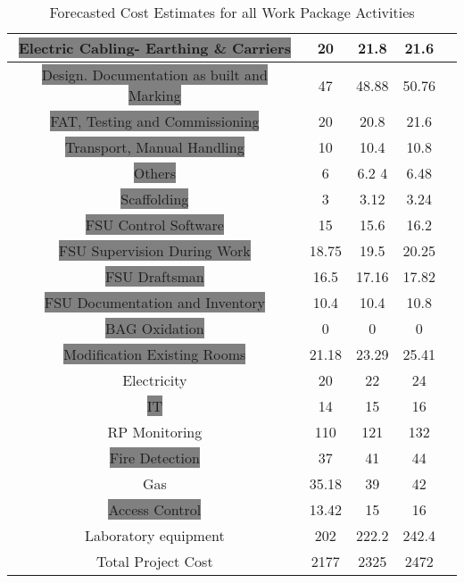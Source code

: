 \begin{table}[ht]
\begin{center}
\begin{tabular}{ |c|c|c|c|c|}
		\hline
		\colorbox{Gray}{Electric Cabling- Earthing \& Carriers}	&20 			& 	21.8				&21.6\\
		\hline
		\colorbox{Gray}{Design. Documentation as built and Marking}	&47  			& 		48.88			&50.76\\
		\hline
		\colorbox{Gray}{FAT, Testing and Commissioning }		&20   							& 	20.8				&21.6\\
		\hline
		\colorbox{Gray}{Transport, Manual Handling }	&10   & 10.4	&10.8\\
		\hline
		\colorbox{Gray}{Others}			&6   		& 	6.2	4			&6.48\\
		\hline
		\colorbox{Gray}{Scaffolding}		&3   							& 	3.12				& 3.24\\
		\hline
		\colorbox{Gray}{FSU Control Software}		&15   							& 		15.6			&16.2\\
		\hline
		\colorbox{Gray}{FSU Supervision During Work}	&18.75   		& 		19.5			&20.25\\
		\hline
		\colorbox{Gray}{FSU Draftsman}		&16.5   			& 	17.16				&17.82\\
		\hline
		\colorbox{Gray}{FSU Documentation and Inventory}	&10.4  							& 			10.4		&10.8\\
		\hline
		\colorbox{Gray}{BAG Oxidation}										&0   							& 	0				&0\\
		\hline
		\colorbox{Gray}{Modification Existing Rooms}	&21.18   							& 		23.29			&25.41\\
		\hline
		\colorbox{Melon}{Electricity}		&20   							& 	22				&24\\
		\hline
		\colorbox{Gray}{IT}		&14   							& 	15				&16\\
		\hline
		\colorbox{Melon}{RP Monitoring}		&110  							& 	121				&132\\
		\hline
		\colorbox{Gray}{Fire Detection}			&37  							& 	41				&44\\
		\hline
		\colorbox{Melon}{Gas }										&35.18					& 			39		&42\\
		\hline
		\colorbox{Gray}{Access Control}			&13.42						& 	15					&16   \\
		\hline
		\colorbox{Melon}{Laboratory equipment}			&202   							& 	222.2				&242.4\\
		\hline
		Total Project 	Cost								&2177   							& 2325					&2472\\
		\hline
	\end{tabular}
\end{center}
\caption[Forecasted Cost Estimates for all Work Package Activities]{Forecasted Cost Estimates for all Work Package Activities}
\label{tab:caption2}
\end{table}%

